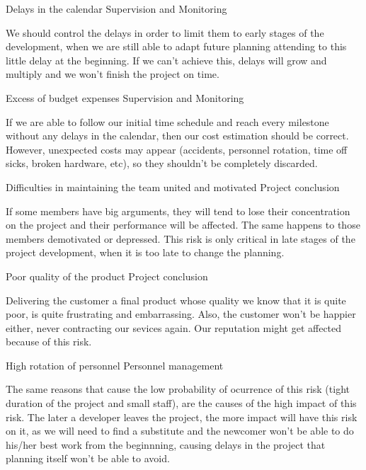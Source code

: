 \begin{risk}{Delays in the calendar}
\riskcat Supervision and Monitoring

We should control the delays in order to limit them to early stages of the development, when we are still able to adapt future planning attending to this little delay at the beginning. If we can't achieve this, delays will grow and multiply and we won't finish the project on time.
\end{risk}

\begin{risk}{Excess of budget expenses}
\riskcat Supervision and Monitoring

If we are able to follow our initial time schedule and reach every milestone without any delays in the calendar, then our cost estimation should be correct. However, unexpected costs may appear (accidents, personnel rotation, time off sicks, broken hardware, etc), so they shouldn't be completely discarded.
\end{risk}

\begin{risk}{Difficulties in maintaining the team united and motivated}
\riskcat Project conclusion

If some members have big arguments, they will tend to lose their concentration on the project and their performance will be affected. The same happens to those members demotivated or depressed. This risk is only critical in late stages of the project development, when it is too late to change the planning.
\end{risk}

\begin{risk}{Poor quality of the product}
\riskcat Project conclusion

Delivering the customer a final product whose quality we know that it is quite poor, is quite frustrating and embarrassing. Also, the customer won't be happier either, never contracting our sevices again. Our reputation might get affected because of this risk.
\end{risk}

\begin{risk}{High rotation of personnel}
\riskcat Personnel management

The same reasons that cause the low probability of ocurrence of this risk (tight duration of the project and small staff), are the causes of the high impact of this risk. The later a developer leaves the project, the more impact will have this risk on it, as we will need to find a substitute and the newcomer won't be able to do his/her best work from the beginnning, causing delays in the project that planning itself won't be able to avoid.
\end{risk}


